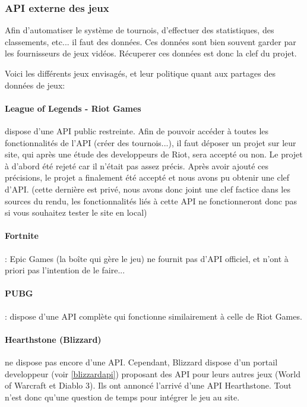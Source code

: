 \documentclass[10pt]{article}
\begin{document}
      \subsubsection{API externe des jeux}
	Afin d'automatiser le système de tournois, d'effectuer des statistiques, des classements, etc... il faut des données.
	Ces données sont bien souvent garder par les fournisseurs de jeux vidéos.
	Récuperer ces données est donc la clef du projet.
	
	Voici les différents jeux envisagés, et leur politique quant aux partages des données de jeux:
	
	\paragraph{League of Legends - Riot Games}  dispose d'une API public restreinte.
	Afin de pouvoir accéder à toutes les fonctionnalités de l'API (créer des tournois...),
	il faut déposer un projet sur leur site, qui après une étude des developpeurs de Riot, sera accepté ou non.
	Le projet à d'abord été rejeté car il n'était pas assez précis.
	Après avoir ajouté ces précisions, le projet a finalement été accepté et nous avons pu obtenir une clef d'API.
	(cette dernière est privé, nous avons donc joint une clef factice dans les sources du rendu, les fonctionnalités liés à cette API ne fonctionneront donc pas si vous souhaitez tester le site en local)
	
	\paragraph{Fortnite} : Epic Games (la boîte qui gère le jeu) ne fournit pas d'API officiel, et n'ont à priori pas l'intention de le faire...
	
	\paragraph{PUBG} : dispose d'une API complète qui fonctionne similairement à celle de Riot Games.
	
	\paragraph{Hearthstone (Blizzard)} ne dispose pas encore d'une API.
	Cependant, Blizzard dispose d'un portail developpeur (voir \ref{blizzardapi}) proposant des API pour leurs autres jeux (World of Warcraft et Diablo 3).
	Ils ont annoncé l'arrivé d'une API Hearthstone. Tout n'est donc qu'une question de temps pour intégrer le jeu au site.
\end{document}
